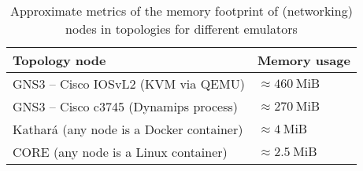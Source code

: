 \begin{table}
  \centering
  \small
  \begin{tabulary}{0.9\textwidth}{ll}
    \toprule
      \textbf{Topology node}                   & \textbf{Memory usage}\\
    \midrule
      GNS3 -- Cisco IOSvL2 (KVM via QEMU)      & $\approx 460~\mbox{MiB}$\\
      GNS3 -- Cisco c3745 (Dynamips process)   & $\approx 270~\mbox{MiB}$\\
      Kathará (any node is a Docker container) & $\approx 4~\mbox{MiB}$\\
      CORE (any node is a Linux container)     & $\approx 2.5~\mbox{MiB}$\\
    \bottomrule
  \end{tabulary}
  \caption{%
    Approximate metrics of the memory footprint of (networking) nodes in topologies for different emulators
  }
  \label{tab:comparativeramusage}
\end{table}
